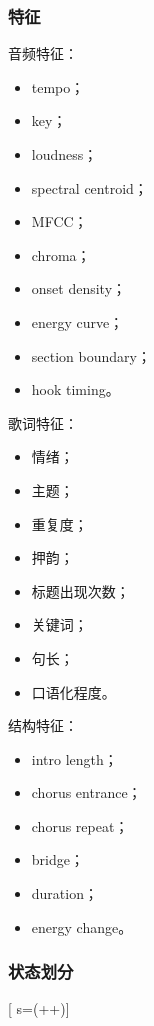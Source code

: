 \documentclass[
  12pt,
]{ctexart}
\providecommand{\tightlist}{%
  \setlength{\itemsep}{0pt}\setlength{\parskip}{0pt}}
\begin{document}
\subsubsection{特征}\label{ux7279ux5f81}

音频特征：

\begin{itemize}
\tightlist
\item
  tempo；
\item
  key；
\item
  loudness；
\item
  spectral centroid；
\item
  MFCC；
\item
  chroma；
\item
  onset density；
\item
  energy curve；
\item
  section boundary；
\item
  hook timing。
\end{itemize}

歌词特征：

\begin{itemize}
\tightlist
\item
  情绪；
\item
  主题；
\item
  重复度；
\item
  押韵；
\item
  标题出现次数；
\item
  关键词；
\item
  句长；
\item
  口语化程度。
\end{itemize}

结构特征：

\begin{itemize}
\tightlist
\item
  intro length；
\item
  chorus entrance；
\item
  chorus repeat；
\item
  bridge；
\item
  duration；
\item
  energy change。
\end{itemize}

\subsubsection{状态划分}\label{ux72b6ux6001ux5212ux5206}

{[} s=(++){]}
\end{document}
